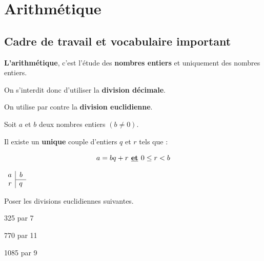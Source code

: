 \documentclass[a4paper]{book}
\begin{document}
\setcounter{chapter}{6}
\renewcommand{\monTitre}{Arithmétique}
\chapter{\monTitre}
\thispagestyle{fancy} 


\section{Cadre de travail et vocabulaire important}
    \textbf{L'arithmétique}, c'est l'étude des \textbf{nombres entiers} et uniquement des nombres entiers.

    \medskip

    On s'interdit donc d'utiliser la \textbf{division décimale}.

    On utilise par contre la \textbf{division euclidienne}.

    \begin{propriete}
        \begin{minipage}{0.6\linewidth}
            Soit $a$ et $b$ deux nombres entiers $(b\neq 0)$.
    
            Il existe un \textbf{unique} couple d'entiers $q$ et $r$ tels que :
    
            \[a=bq+r \textbf{ \underline{et} } 0\leq r < b\]
    
        \end{minipage}
        \hfill
        \begin{minipage}{0.35\linewidth}
            $\begin{array}{r|r}
            a & b \\ \cline{2-2}
            r & q 
            \end{array}$
        \end{minipage} 
    \end{propriete}


    \begin{exemple}
        Poser les divisions euclidiennes suivantes.

        \smallskip

        \begin{minipage}{0.30\linewidth}
            325 par 7
            
            \vspace{3cm}
        \end{minipage}
        \hfill
        \vline
        \hfill
        \begin{minipage}{0.30\linewidth}
            770 par 11 
             
            \vspace{3cm}
        \end{minipage}
        \hfill
        \vline
        \hfill
        \begin{minipage}{0.30\linewidth}
            1085 par 9
            
            \vspace{3cm}
        \end{minipage}
    \end{exemple}
\end{document}
